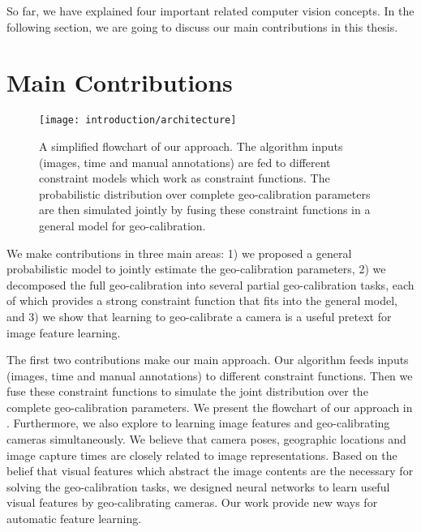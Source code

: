 So far, we have explained four important related computer vision
concepts. In the following section, we are going to discuss our main
contributions in this thesis.

\section{Main Contributions}

\begin{figure}
  \centering
  \texttt{[image: introduction/architecture]}
  \caption{A simplified flowchart of our approach. The algorithm
inputs (images, time and manual annotations) are fed to different
constraint models which work as constraint functions. 
The probabilistic distribution over complete geo-calibration
parameters are then simulated jointly by fusing these constraint
functions in a general model for geo-calibration.}
  \label{fig:intro:architecture}
\end{figure}

We make contributions in three main areas: 1) we proposed a general
probabilistic model to jointly estimate the geo-calibration
parameters, 2) we decomposed the full geo-calibration into several
partial geo-calibration tasks, each of which provides a strong
constraint function that fits into the general model, and 3) we show
that learning to geo-calibrate a camera is a useful pretext for image
feature learning.
 
The first two contributions make our main approach. Our
algorithm feeds inputs (images, time and manual annotations) to
different constraint functions. Then
we fuse these constraint functions to simulate the joint distribution
over the complete geo-calibration parameters. We present the flowchart of
our approach in .
%
Furthermore, we also explore to learning image features
and geo-calibrating cameras simultaneously.  We believe that camera
poses, geographic locations and image capture times are closely
related to image representations. 
Based on the belief that visual features which abstract the image
contents are the necessary for solving the geo-calibration tasks, we
designed neural networks to learn useful visual features by
geo-calibrating cameras. Our work provide new ways for automatic
feature learning.


